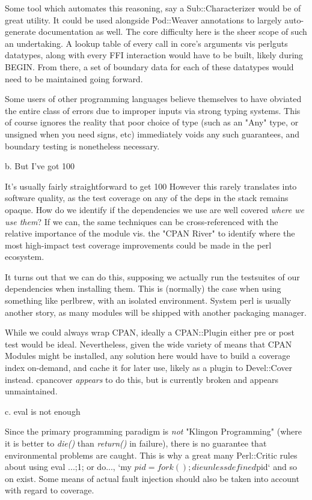\documentclass[twoside]{article}
\begin{document}
Some tool which automates this reasoning, say a Sub::Characterizer would be of great utility. It could be used alongside Pod::Weaver annotations to largely auto-generate documentation as well.
The core difficulty here is the sheer scope of such an undertaking.  A lookup table of every call in core's arguments vis perlguts datatypes, along with every FFI interaction would have to be built, likely during BEGIN.
From there, a set of boundary data for each of these datatypes would need to be maintained going forward.

Some users of other programming languages believe themselves to have obviated the entire class of errors due to improper inputs via strong typing systems.
This of course ignores the reality that poor choice of type (such as an "Any" type, or unsigned when you need signs, etc) immediately voids any such guarantees, and boundary testing is nonetheless necessary.

b. But I've got 100%

It's usually fairly straightforward to get 100%
However this rarely translates into software quality, as the test coverage on any of the deps in the stack remains opaque.
How do we identify if the dependencies we use are well covered \textit{where we use them}?
If we can, the same techniques can be cross-referenced with the relative importance of the module vis. the "CPAN River" to identify where the most high-impact test coverage improvements could be made in the perl ecosystem.

It turns out that we can do this, supposing we actually run the testsuites of our dependencies when installing them.
This is (normally) the case when using something like perlbrew, with an isolated environment.
System perl is usually another story, as many modules will be shipped with another packaging manager.

While we could always wrap CPAN, ideally a CPAN::Plugin either pre or post test would be ideal.
Nevertheless, given the wide variety of means that CPAN Modules might be installed, any solution here would have to build a coverage index on-demand, and cache it for later use, likely as a plugin to Devel::Cover instead.
cpancover \textit{appears} to do this, but is currently broken and appears unmaintained.

c. eval {} is not enough

Since the primary programming paradigm is \textit{not} "Klingon Programming" (where it is better to \textit{die()} than \textit{return()} in failure), there is no guarantee that environmental problems are caught.
This is why a great many Perl::Critic rules about using eval {...;1;} or do..., `my $pid=fork(); die unless defined $pid` and so on exist.
Some means of actual fault injection should also be taken into account with regard to coverage.
\end{document}
